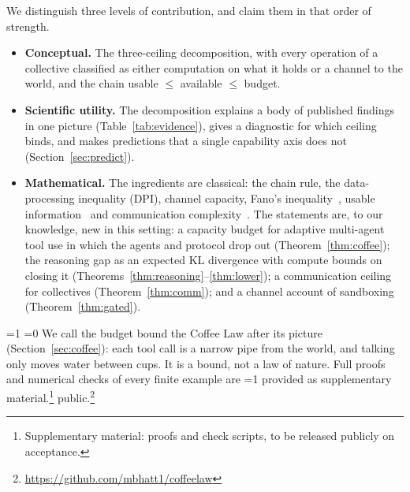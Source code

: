 \documentclass[conference]{IEEEtran}
\providecommand{\PaperAnon}{0}   %
\providecommand{\PaperFinal}{0}  %
\providecommand{\PaperShort}{0}  %
\theoremstyle{definition}
\begin{document}
We distinguish three levels of contribution, and claim them in that order of
strength.
\begin{itemize}
\item \textbf{Conceptual.} The three-ceiling decomposition, with every operation
of a collective classified as either computation on what it holds or a channel
to the world, and the chain usable $\le$ available $\le$ budget.
\item \textbf{Scientific utility.} The decomposition explains a body of published
findings in one picture (Table~\ref{tab:evidence}), gives a diagnostic for which
ceiling binds, and makes predictions that a single capability axis does not
(Section~\ref{sec:predict}).
\item \textbf{Mathematical.} The ingredients are classical: the chain rule, the
data-processing inequality (DPI), channel capacity, Fano's
inequality~\cite{cover2006}, usable information~\cite{xu2020} and communication
complexity~\cite{kushilevitz1997}. The statements are, to our knowledge, new in
this setting: a capacity budget for adaptive multi-agent tool use in which the
agents and protocol drop out (Theorem~\ref{thm:coffee}); the reasoning gap as an
expected KL divergence with compute bounds on closing it
(Theorems~\ref{thm:reasoning}--\ref{thm:lower}); a communication ceiling for
collectives (Theorem~\ref{thm:comm}); and a channel account of sandboxing
(Theorem~\ref{thm:gated}).
\end{itemize}
\ifnum\PaperFinal=1 \IEEEpubidadjcol\fi
\ifnum\PaperShort=0
We call the budget bound the Coffee Law after its picture (Section~\ref{sec:coffee}):
each tool call is a narrow pipe from the world, and talking only moves water
between cups. It is a bound, not a law of nature.
\fi
Full proofs and numerical checks of every finite example are
\ifnum\PaperAnon=1 provided as supplementary material.\footnote{Supplementary
material: proofs and check scripts, to be released publicly on acceptance.}%
\else public.\footnote{\url{https://github.com/mbhatt1/coffeelaw}}\fi
\end{document}
